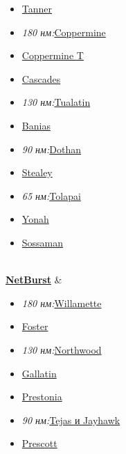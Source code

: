 \documentclass[a4paper,11pt]{article}
\begin{document}
\begin{tabular}
\begin{tabular}
\begin{tabular}
\begin{itemize}
	\item \href{https://ru.wikipedia.org/w/index.php?title=Tanner&amp;action=edit&amp;redlink=1}{Tanner}
	\item \textit{180 нм:}\href{https://ru.wikipedia.org/wiki/Pentium_III#Coppermine}{Coppermine}
	\item \href{https://ru.wikipedia.org/wiki/Coppermine_T}{Coppermine T}
	\item \href{https://ru.wikipedia.org/w/index.php?title=Cascades&amp;action=edit&amp;redlink=1}{Cascades}
	\item \textit{130 нм:}\href{https://ru.wikipedia.org/wiki/Tualatin}{Tualatin}
	\item \href{https://ru.wikipedia.org/wiki/Banias}{Banias}
	\item \textit{90 нм:}\href{https://ru.wikipedia.org/wiki/Dothan}{Dothan}
	\item \href{https://ru.wikipedia.org/wiki/Stealey}{Stealey}
	\item \textit{65 нм:}\href{https://ru.wikipedia.org/wiki/Tolapai}{Tolapai}
	\item \href{https://ru.wikipedia.org/wiki/Yonah}{Yonah}
	\item \href{https://ru.wikipedia.org/w/index.php?title=Sossaman_(%D0%BF%D1%80%D0%BE%D1%86%D0%B5%D1%81%D1%81%D0%BE%D1%80)&amp;action=edit&amp;redlink=1}{Sossaman}
\end{itemize} \\ 
\textbf{\href{https://ru.wikipedia.org/wiki/NetBurst}{NetBurst}} & 
\begin{itemize}
	\item \textit{180 нм:}\href{https://ru.wikipedia.org/wiki/Willamette}{Willamette}
	\item \href{https://ru.wikipedia.org/w/index.php?title=Foster_(%D0%BF%D1%80%D0%BE%D1%86%D0%B5%D1%81%D1%81%D0%BE%D1%80)&amp;action=edit&amp;redlink=1}{Foster}
	\item \textit{130 нм:}\href{https://ru.wikipedia.org/wiki/Northwood}{Northwood}
	\item \href{https://ru.wikipedia.org/w/index.php?title=Gallatin&amp;action=edit&amp;redlink=1}{Gallatin}
	\item \href{https://ru.wikipedia.org/w/index.php?title=Prestonia&amp;action=edit&amp;redlink=1}{Prestonia}
	\item \textit{90 нм:}\href{https://ru.wikipedia.org/w/index.php?title=Tejas_%D0%B8_Jayhawk&amp;action=edit&amp;redlink=1}{Tejas и Jayhawk}
	\item \href{https://ru.wikipedia.org/wiki/Prescott}{Prescott}

\end{itemize}
\end{tabular}
\end{tabular}
\end{tabular}
\end{document}
